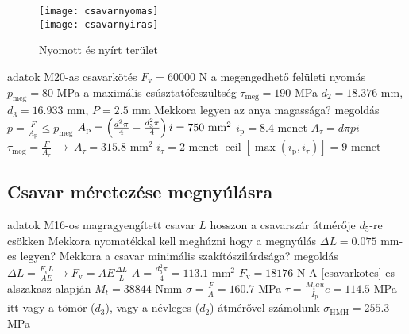 \begin{wrapfigure}{r}{.4\textwidth}
 \vspace{-4cm}
 \centering
 \texttt{[image: csavarnyomas]}\\
 \texttt{[image: csavarnyiras]}
 \caption{Nyomott és nyírt terület}
\end{wrapfigure}
\parbox{.6\textwidth}{
\begin{outline}
	\1 adatok
		\2 M20-as csavarkötés
		\2 $F_\text{v} = 60000$ N
		\2 a megengedhető felületi nyomás $p_\text{meg} = 80$ MPa
		\2 a maximális csúsztatófeszültség $\tau_\text{meg} = 190$ MPa
		\2 $d_2 = 18.376$ mm, $d_3 = 16.933$ mm, $P = 2.5$ mm
		\2 Mekkora legyen az anya magassága?
	\1 megoldás
		\2 $p = \frac{F}{A_\text{p}} \le p_\text{meg}$
		\2 $A_\text{p} = \left(\frac{d^2\pi}{4} - \frac{d_3^2\pi}{4}\right)i = 750 \text{ mm}^2$
		\2 $i_\text{p} = 8.4$ menet
		\2 $A_\tau = d\pi pi$
		\2 $\tau_\text{meg} = \frac{F}{A_\tau}~\rightarrow~A_\tau=315.8\text{ mm}^2$
		\2 $i_\tau = 2$ menet
		\2 $\operatorname{ceil}[\max(i_\text{p}, i_\tau)] = 9$ menet
\end{outline}}

\subsection{Csavar méretezése megnyúlásra}%

\begin{outline}
	\1 adatok
		\2 M16-os magragyengített csavar
		\2 $L$ hosszon a csavarszár átmérője $d_5$-re csökken
		\2 Mekkora nyomatékkal kell meghúzni hogy a megnyúlás $\Delta L=0.075$ mm-es legyen?
		\2 Mekkora a csavar minimális szakítószilárdsága?
	\1 megoldás
		\2 $\Delta L = \frac{F_\text{v}L}{AE}\rightarrow F_\text{v} = AE\frac{\Delta L}{L}$
		\2 $A = \frac{d_5^2\pi}{4} = 113.1 \text{ mm}^2$
		\2 $F_\text{v} = 18176$ N
		\2 A \ref{csavarkotes}-es alszakasz alapján $M_t = 38844$ Nmm
		\2 $\sigma = \frac{F}{A} = 160.7$ MPa
		\2 $\tau = \frac{M_tau}{I_\text{p}}e = 114.5$ MPa
		\2 itt vagy a tömör ($d_3$), vagy a névleges ($d_2$) átmérővel számolunk
		\2 $\sigma_\text{HMH} = 255.3$ MPa
\end{outline}
